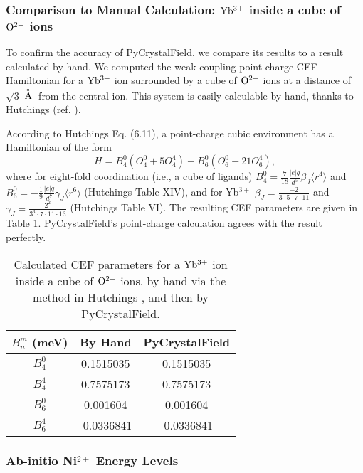 \documentclass[twocolumn,english,prb]{revtex4-2}
\newcommand{\angstrom}{${\buildrel _{\circ} \over {\mathrm{A}}}$}
\begin{document}
\subsubsection{Comparison to Manual Calculation: $\rm Yb^{3+}$ inside a cube of $\rm O^{2-}$ ions}

To confirm the accuracy of PyCrystalField, we compare its results to a result calculated by hand. We computed the weak-coupling point-charge CEF Hamiltonian for a $\rm Yb^{3+}$ ion surrounded by a cube of $\rm O^{2-}$ ions at a distance of $\sqrt{3}$ \angstrom$\>$ from the central ion. This system is easily calculable by hand, thanks to Hutchings (ref. \cite{Hutchings1964}).

According to Hutchings Eq. (6.11), a point-charge cubic environment has a Hamiltonian of the form 
\begin{equation}
H = B_4^0 (O_4^0 + 5 O_4^4) +  B_6^0 (O_6^0 - 21 O_6^4),
\end{equation}
where for eight-fold coordination (i.e., a cube of ligands) $B_4^0 = \frac{7}{18}\frac{|e|q}{d^5}\beta_J \langle r^4 \rangle$ and $B_6^0 = -\frac{1}{9}\frac{|e|q}{d^7}\gamma_J \langle r^6 \rangle$ (Hutchings Table XIV), and 
for Yb$^{3+}$ 
$\beta_J = \frac{-2}{3 \cdot 5 \cdot 7 \cdot 11}$ and $\gamma_J = \frac{2^2}{3^3 \cdot 7 \cdot 11 \cdot 13}$ (Hutchings Table VI).
The resulting CEF parameters are given in Table \ref{flo:YbCube_CEF_params}. PyCrystalField's point-charge calculation agrees with the result perfectly.

\begin{table}
	\centering
	\caption{Calculated CEF parameters for a $\rm Yb^{3+}$ ion inside a cube of $\rm O^{2-}$ ions, by hand via the method in Hutchings \cite{Hutchings1964}, and then by PyCrystalField.}
		\begin{tabular}{c|cc}
			\hline \hline
			$B_n^m$ (meV) & By Hand & PyCrystalField \\
			\hline 
			$ B_4^0$ & 0.1515035 & 0.1515035 \\
			$ B_4^4$ & 0.7575173 & 0.7575173 \\
			$ B_6^0$ & 0.001604 & 0.001604 \\
			$ B_6^4$ & -0.0336841 & -0.0336841 \\
			\hline \hline
		\end{tabular}
		\label{flo:YbCube_CEF_params}
	\end{table}



\subsubsection{Ab-initio Ni$^{2+}$ Energy Levels}
\end{document}
